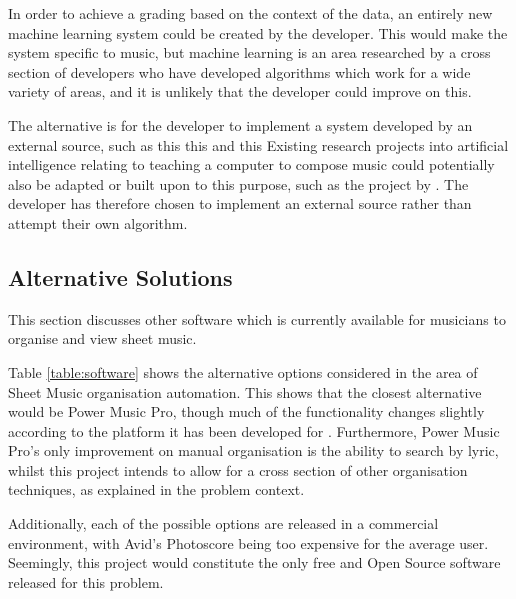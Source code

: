 In order to achieve a grading based on the context of the data, an entirely new machine learning system could be created by the developer. This would make the system specific to music, but machine learning is an area researched by a cross section of developers who have developed algorithms which work for a wide variety of areas, and it is unlikely that the developer could improve on this.

The alternative is for the developer to implement a system developed by an external source, such as this this and this %
Existing research projects into artificial intelligence relating to teaching a computer to compose music could potentially also be adapted or built upon to this purpose, such as the project by \cite{creativeMachines}. 
The developer has therefore chosen to implement an external source rather than attempt their own algorithm.


\subsection{Alternative Solutions}
This section discusses other software which is currently available for musicians to organise and view sheet music.

Table \ref{table:software} shows the alternative options considered in the area of Sheet Music organisation automation. This shows that the closest alternative would be Power Music Pro, though much of the functionality changes slightly according to the platform it has been developed for \parencite{PowerMusic}. Furthermore, Power Music Pro's only improvement on manual organisation is the ability to search by lyric, whilst this project intends to allow for a cross section of other organisation techniques, as explained in the problem context.

Additionally, each of the possible options are released in a commercial environment, with Avid's Photoscore being too expensive for the average user.  Seemingly, this project would constitute the only free and Open Source software released for this problem.

